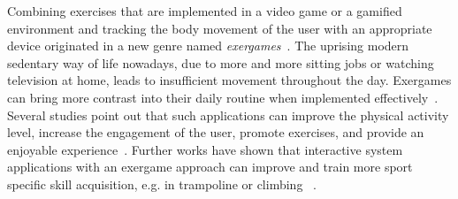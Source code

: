 Combining exercises that are implemented in a video game or a gamified environment and tracking the body movement of the user with an appropriate device originated in a new genre named \textit{exergames}~\cite{Buddharaju2016-ex, Sinclair2007-ex}.
The uprising modern sedentary way of life nowadays, due to more and more sitting jobs or watching television at home, leads to insufficient movement throughout the day.
Exergames can bring more contrast into their daily routine when implemented effectively~\cite{Rudella2012-ex}.
Several studies point out that such applications can improve the physical activity level, increase the engagement of the user, promote exercises, and provide an enjoyable experience~\cite{Graf2009-ex, Hicks2010-ex, Thin2010-ex}.
Further works have shown that interactive system applications with an exergame approach can improve and train more sport specific skill acquisition, e.g. in trampoline or climbing ~\cite{Bogdanovych2015-ci, Medeiros2017-ex, Holsti2013-kn, Jensen2014-ex, Kajastila2016-ot}.

